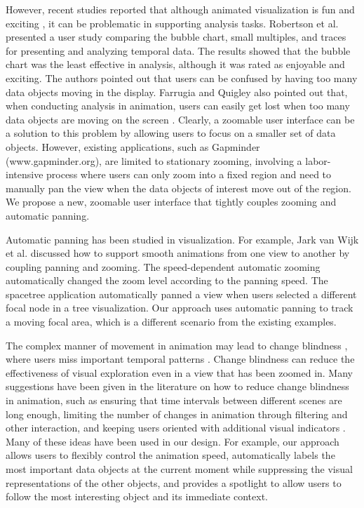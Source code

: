 \documentclass[review]{vgtc}                 %
\begin{document}
However, recent studies reported that although animated visualization is fun and exciting \cite{farrugia2011effective,robertson_effectiveness_2008,tekusova_applying_2007}, it can be problematic in supporting analysis tasks. Robertson et al. \cite{robertson_effectiveness_2008} presented a user study comparing the bubble chart, small multiples, and traces for presenting and analyzing temporal data. The results showed that the bubble chart was the least effective in analysis, although it was rated as enjoyable and exciting. The authors pointed out that users can be confused by having too many data objects moving in the display. Farrugia and Quigley also pointed out that, when conducting analysis in animation, users can easily get lost when too many data objects are moving on the screen \cite{farrugia2011effective}. Clearly, a zoomable user interface can be a solution to this problem by allowing users to focus on a smaller set of data objects. However, existing applications, such as Gapminder (www.gapminder.org), are limited to stationary zooming, involving a labor-intensive process where users can only zoom into a fixed region and need to manually pan the view when the data objects of interest move out of the region.  We propose a new, zoomable user interface that tightly couples zooming and automatic panning.

Automatic panning has been studied in visualization. For example, Jark van Wijk et al. \cite {van2003smooth} discussed how to support smooth animations from one view to another by coupling panning and zooming. The speed-dependent automatic zooming \cite{igarashi2000speed} automatically changed the zoom level according to the panning speed. The spacetree application \cite{plaisant2002spacetree} automatically panned a view when users selected a different focal node in a tree visualization. Our approach uses automatic panning to track a moving focal area, which is a different scenario from the existing examples.

The complex manner of movement in animation may lead to change blindness \cite{french1953discrimination}, where users miss important temporal patterns \cite{nowell_change_2001,yi_toward_2007}. Change blindness can reduce the effectiveness of visual exploration even in a view that has been zoomed in. Many suggestions have been given in the literature on how to reduce change blindness in animation, such as ensuring that time intervals between different scenes are long enough, limiting the number of changes in animation through filtering and other interaction, and keeping users oriented with additional visual indicators \cite{schlienger2007improving}. Many of these ideas have been used in our design. For example, our approach allows users to flexibly control the animation speed, automatically labels the most important data objects at the current moment while suppressing the visual representations of the other objects, and provides a spotlight to allow users to follow the most interesting object and its immediate context.
\end{document}
